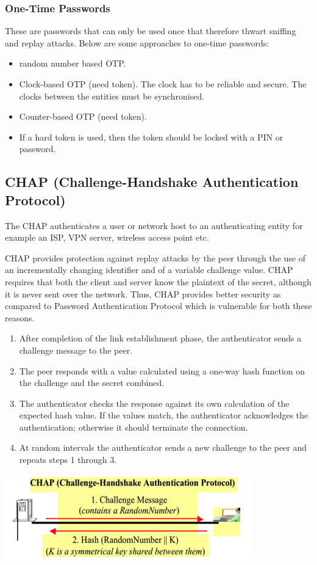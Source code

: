 \documentclass{article}
\begin{document}
\subsubsection{One-Time Passwords}
These are passwords that can only be used once that therefore thwart sniffing and replay attacks. Below are some approaches to one-time passwords:
\begin{itemize}
  \item random number based OTP.
  \item Clock-based OTP (need token). The clock has to be reliable and secure. The clocks between the entities must be synchronised.
  \item Counter-based OTP (need token).
  \item If a hard token is used, then the token should be locked with a PIN or password.
\end{itemize}

\subsection{CHAP (Challenge-Handshake Authentication Protocol)}
The CHAP authenticates a user or network host to an authenticating entity for example an ISP, VPN server, wireless access point etc.

CHAP provides protection against replay attacks by the peer through the use of an incrementally changing identifier and of a variable challenge value. CHAP requires that both the client and server know the plaintext of the secret, although it is never sent over the network. Thus, CHAP provides better security as compared to Password Authentication Protocol which is vulnerable for both these reasons.
\begin{enumerate}
  \item After completion of the link establishment phase, the authenticator sends a challenge message to the peer.
  \item The peer responds with a value calculated using a one-way hash function on the challenge and the secret combined.
  \item The authenticator checks the response against its own calculation of the expected hash value. If the values match, the authenticator acknowledges the authentication; otherwise it should terminate the connection.
  \item At random intervals the authenticator sends a new challenge to the peer and repeats steps 1 through 3.
\end{enumerate}
\begin{center}
  \includegraphics[scale=0.6]{chap.png}
\end{center}
\end{document}
